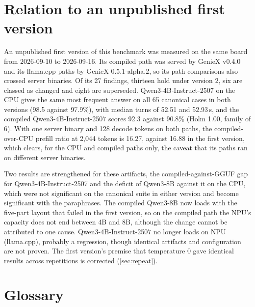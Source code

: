 \documentclass[11pt]{article}
\begin{document}
\section{Relation to an unpublished first version}\label{app:v1}

An unpublished first version of this benchmark was measured on the same board from 2026-09-10 to 2026-09-16. Its compiled path was served by GenieX v0.4.0 and its llama.cpp paths by GenieX 0.5.1-alpha.2, so its path comparisons also crossed server binaries. Of its 27 findings, thirteen hold under version 2, six are classed as changed and eight are superseded. Qwen3-4B-Instruct-2507 on the CPU gives the same most frequent answer on all 65 canonical cases in both versions (98.5 against 97.9\%), with median turns of 52.51 and 52.93\,s, and the compiled Qwen3-4B-Instruct-2507 scores 92.3 against 90.8\% (Holm 1.00, family of 6). With one server binary and 128 decode tokens on both paths, the compiled-over-CPU prefill ratio at 2,044 tokens is 16.27, against 16.88 in the first version, which clears, for the CPU and compiled paths only, the caveat that its paths ran on different server binaries.

Two results are strengthened for these artifacts, the compiled-against-GGUF gap for Qwen3-4B-Instruct-2507 and the deficit of Qwen3-8B against it on the CPU, which were not significant on the canonical suite in either version and become significant with the paraphrases. The compiled Qwen3-8B now loads with the five-part layout that failed in the first version, so on the compiled path the NPU's capacity does not end between 4B and 8B, although the change cannot be attributed to one cause. Qwen3-4B-Instruct-2507 no longer loads on NPU (llama.cpp), probably a regression, though identical artifacts and configuration are not proven. The first version's premise that temperature 0 gave identical results across repetitions is corrected (\cref{sec:repeat}).

\section{Glossary}\label{app:glossary}
\end{document}
